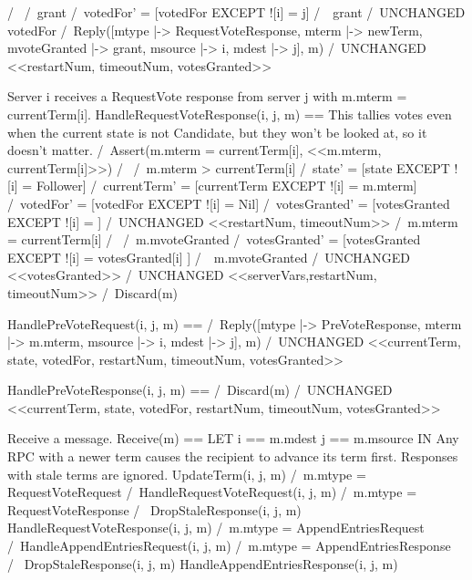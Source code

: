        /\ \/ /\ grant  
             /\ votedFor' = [votedFor EXCEPT ![i] = j]
          \/ /\ ~grant 
             /\ UNCHANGED votedFor
       /\ Reply([mtype        |-> RequestVoteResponse,
                 mterm        |-> newTerm,
                 mvoteGranted |-> grant,
                 msource      |-> i,
                 mdest        |-> j],
                 m)    
       /\ UNCHANGED <<restartNum, timeoutNum, votesGranted>>

\* Server i receives a RequestVote response from server j with
\* m.mterm = currentTerm[i].
HandleRequestVoteResponse(i, j, m) ==
    \* This tallies votes even when the current state is not Candidate, but
    \* they won't be looked at, so it doesn't matter. 
    \* /\ Assert(m.mterm = currentTerm[i], <<m.mterm, currentTerm[i]>>)
    /\ \/ /\ m.mterm > currentTerm[i]
          /\ state'        = [state EXCEPT ![i] = Follower]
          /\ currentTerm'  = [currentTerm EXCEPT ![i] = m.mterm]
          /\ votedFor'     = [votedFor EXCEPT ![i] = Nil]
          /\ votesGranted' = [votesGranted EXCEPT ![i] = {}]
          /\ UNCHANGED <<restartNum, timeoutNum>>
       \/ /\ m.mterm = currentTerm[i]
          /\ \/ /\ m.mvoteGranted
                /\ votesGranted' = [votesGranted EXCEPT ![i] =
                                    votesGranted[i] ]
             \/ /\ ~m.mvoteGranted
                /\ UNCHANGED <<votesGranted>>
          /\ UNCHANGED <<serverVars,restartNum, timeoutNum>>
    /\ Discard(m)

HandlePreVoteRequest(i, j, m) ==
       /\ Reply([mtype        |-> PreVoteResponse,
                 mterm        |-> m.mterm,
                 msource      |-> i,
                 mdest        |-> j],
                 m)    
       /\ UNCHANGED <<currentTerm, state, votedFor, restartNum, timeoutNum, votesGranted>>

HandlePreVoteResponse(i, j, m) ==
       /\ Discard(m) 
       /\ UNCHANGED <<currentTerm, state, votedFor, restartNum, timeoutNum, votesGranted>>

\* Receive a message.
Receive(m) ==
    LET i == m.mdest
        j == m.msource
    IN \* Any RPC with a newer term causes the recipient to advance
       \* its term first. Responses with stale terms are ignored.
       \/ UpdateTerm(i, j, m)
       \/ /\ m.mtype = RequestVoteRequest
          /\ HandleRequestVoteRequest(i, j, m)
       \/ /\ m.mtype = RequestVoteResponse
          /\ \/ DropStaleResponse(i, j, m)
             \/ HandleRequestVoteResponse(i, j, m)
       \/ /\ m.mtype = AppendEntriesRequest
          /\ HandleAppendEntriesRequest(i, j, m)
       \/ /\ m.mtype = AppendEntriesResponse
          /\ \/ DropStaleResponse(i, j, m)
             \/ HandleAppendEntriesResponse(i, j, m)


